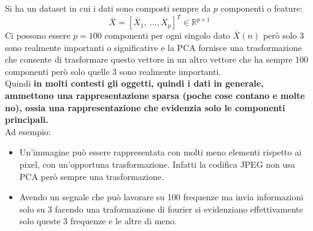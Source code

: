 Si ha un dataset in cui i dati sono composti sempre da $p$ componenti o feature:
$$
\overline{X}=\left[\overline{X}_1,\ \dots, \overline{X}_p\right]^T\in \mathbb{R}^{p\times1}
$$
Ci possono essere $p=100$ componenti per ogni singolo dato $\overline{X}(n)$ però solo 3 sono realmente importanti o significative e la PCA fornisce una trasformazione che consente di trasformare questo vettore in un altro vettore che ha sempre 100 componenti però solo quelle 3 sono realmente importanti.\\
Quindi \textbf{in molti contesti gli oggetti, quindi i dati in generale, ammettono una rappresentazione sparsa (poche cose contano e molte no), ossia una rappresentazione che evidenzia solo le componenti principali.}\\
Ad esempio:

\begin{itemize}[noitemsep, topsep=3pt]
  \item Un’immagine può essere rappresentata con molti meno elementi rispetto ai pixel, con un’opportuna trasformazione. Infatti la codifica JPEG non usa PCA però sempre una trasformazione.
  \item Avendo un segnale che può lavorare su 100 frequenze ma invia informazioni solo su 3 facendo una traformazione di fourier si evidenziano effettivamente solo queste 3 frequenze e le altre di meno.
\end{itemize}



